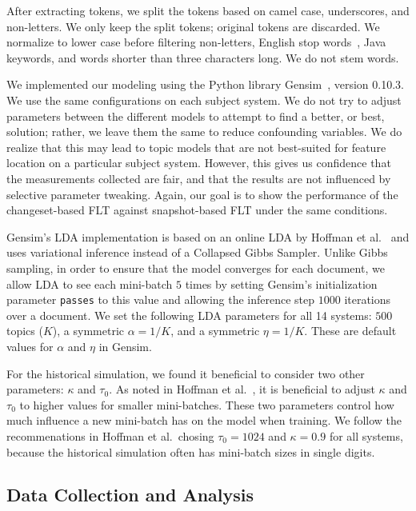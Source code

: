 After extracting tokens, we split the tokens based on camel case,
underscores, and non-letters.
We only keep the split tokens; original tokens are discarded.
We normalize to lower case before filtering non-letters, English stop words~\cite{StopWords}, Java keywords, and words shorter than three characters long.
We do not stem words.

We implemented our modeling using the Python library Gensim~\cite{Gensim},
version 0.10.3. We use the same configurations on each subject system.  We do
not try to adjust parameters between the different models to attempt to find
a better, or best, solution; rather, we leave them the same to reduce
confounding variables.  We do realize that this may lead to topic models that
are not best-suited for feature location on a particular subject system.
However, this gives us confidence that the measurements collected are fair, and
that the results are not influenced by selective parameter tweaking.  Again, our
goal is to show the performance of the changeset-based FLT against
snapshot-based FLT under the same conditions.

Gensim's LDA implementation is based on an online LDA by Hoffman et
al.~\cite{Hoffman-etal:2010} and uses variational inference instead of
a Collapsed Gibbs Sampler.  Unlike Gibbs sampling, in order to ensure that the
model converges for each document, we allow LDA to see each mini-batch $5$ times
by setting Gensim's initialization parameter \texttt{passes} to this value and
allowing the inference step $1000$ iterations over a document.  We set the
following LDA parameters for all 14 systems: $500$ topics ($K$), a symmetric
$\alpha=1/K$, and a symmetric $\eta=1/K$.  These are default values for
$\alpha$ and $\eta$ in Gensim.

For the historical simulation, we found it beneficial to consider two other
parameters: $\kappa$ and $\tau_0$.  As noted in Hoffman et
al.~\cite{Hoffman-etal:2010}, it is beneficial to adjust $\kappa$ and $\tau_0$
to higher values for smaller mini-batches.  These two parameters control how
much influence a new mini-batch has on the model when training.  We follow the
recommenations in Hoffman et al.\, chosing $\tau_0=1024$ and $\kappa=0.9$ for
all systems, because the historical simulation often has mini-batch sizes in
single digits.




\subsection{Data Collection and Analysis}
\label{sec:data}

